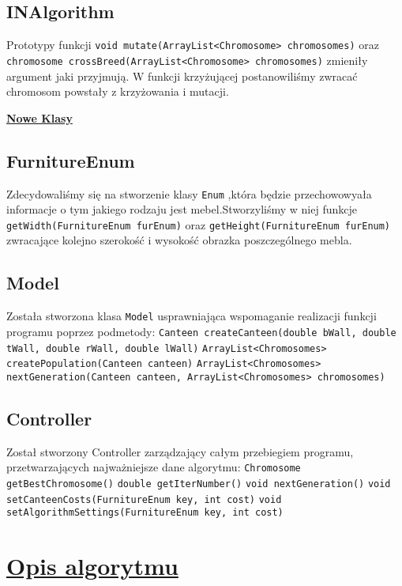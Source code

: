 \documentclass{article}
\begin{document}
\subsection{INAlgorithm}
\indent Prototypy funkcji \verb|void mutate(ArrayList<Chromosome> chromosomes)| oraz \verb|chromosome crossBreed(ArrayList<Chromosome> chromosomes)| zmieniły argument jaki przyjmują. W funkcji krzyżującej postanowiliśmy zwracać chromosom powstały z krzyżowania i mutacji.
\begin{center}
\vspace{3mm}
\underline{\huge\textbf{{Nowe Klasy}}}
\subsection{FurnitureEnum}
\indent Zdecydowaliśmy się na stworzenie klasy \verb|Enum| ,która będzie przechowowyała informacje o tym jakiego rodzaju jest mebel.Stworzyliśmy w niej funkcje \verb|getWidth(FurnitureEnum furEnum)| oraz \verb|getHeight(FurnitureEnum furEnum)| zwracające kolejno szerokość i wysokość obrazka poszczególnego mebla.
\subsection{Model}
\indent Została stworzona klasa \verb|Model| usprawniająca wspomaganie realizacji funkcji programu poprzez podmetody:
\indent \verb|Canteen createCanteen(double bWall, double tWall, double rWall, double lWall)|
\indent \verb|ArrayList<Chromosomes> createPopulation(Canteen canteen)| 
\indent \verb|ArrayList<Chromosomes> nextGeneration(Canteen canteen, ArrayList<Chromosomes> chromosomes)|
\subsection{Controller}
\indent Został stworzony Controller zarządzający całym przebiegiem programu, przetwarzających najważniejsze dane algorytmu:
\indent \verb|Chromosome getBestChromosome()|
\indent \verb|double getIterNumber()| 
\indent \verb|void nextGeneration()|
\indent \verb|void setCanteenCosts(FurnitureEnum key, int cost)|
\indent \verb|void setAlgorithmSettings(FurnitureEnum key, int cost)|
\end{center}
\newpage
\section{\textbf{\underline{Opis algorytmu}}}
\end{document}
